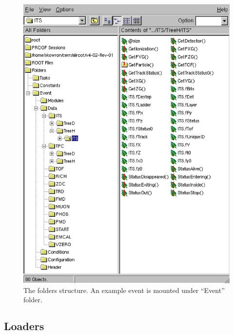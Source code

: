 \documentclass[12pt,a4paper,twoside]{article}
\begin{document}
{\begin{figure}
  \begin{center}
    \includegraphics[width=0.8\columnwidth, origin=c]{picts/folderstruct}
  \end{center}
  \caption
  {The folders structure. An example event is mounted under ``Event'' folder.
    \label{cap:soft:folderstruct}}
\end{figure}


\subsection {Loaders}

}
\end{document}
